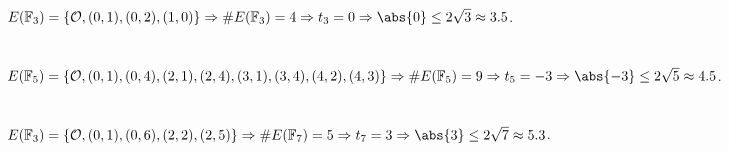 \documentclass[
  coursecode={MTHE 418},
  assignmentname={Homework \homeworknumber},
  studentnumber=20053722,
  name={Bryan Hoang},
  draft,
]{
  ltxanswer%
}
\begin{document}
  \begin{questions}
    \setcounter{question}{\questionnumber}
    \addtocounter{question}{-1}
    \question[10]\
    \begin{parts}
      \part{}
      \begin{solution}
        \(E(\mathbb{F}_{3}) = \{\mathcal{O}, (0, 1), (0, 2), (1, 0)\} \Rightarrow \#E(\mathbb{F}_{3}) = 4 \Rightarrow t_{3} = 0 \Rightarrow \abs{0} \le 2\sqrt{3} \approx 3.5\).
      \end{solution}

      \part{}
      \begin{solution}
        \(E(\mathbb{F}_{5}) = \{\mathcal{O}, (0, 1), (0, 4), (2, 1), (2, 4), (3, 1), (3, 4), (4, 2), (4, 3)\} \Rightarrow \#E(\mathbb{F}_{5}) = 9 \Rightarrow t_{5} = -3 \Rightarrow \abs{-3} \le 2\sqrt{5} \approx 4.5\).
      \end{solution}

      \part{}
      \begin{solution}
        \(E(\mathbb{F}_{3}) = \{\mathcal{O}, (0, 1), (0, 6), (2, 2), (2, 5)\} \Rightarrow \#E(\mathbb{F}_{7}) = 5 \Rightarrow t_{7} = 3 \Rightarrow \abs{3} \le 2\sqrt{7} \approx 5.3\).
      \end{solution}
    \end{parts}
  \end{questions}
\end{document}
